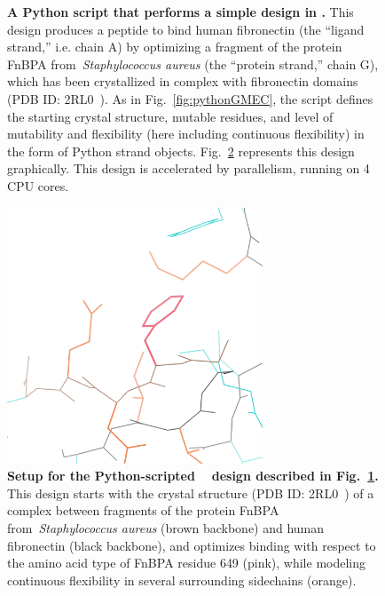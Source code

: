 \begin{figure}
\vspace{-0.7in}
\resizebox{\textwidth}{!}
{
	
}
\caption{\textbf{A Python script that performs a simple \bbks design in .}  This design produces a peptide to bind human fibronectin (the ``ligand strand,'' i.e. chain A) by optimizing a fragment of the protein FnBPA from~\textit{Staphylococcus aureus} (the ``protein strand,'' chain G), which has been crystallized in complex with fibronectin domains (PDB ID: 2RL0~\cite{2RL0}).  As in Fig.~\ref{fig:pythonGMEC}, the script defines the starting crystal structure, mutable residues, and level of mutability and flexibility (here including continuous flexibility) in the form of Python strand objects.   Fig.~\ref{fig:pythonBBKSpic} represents this design graphically.  This design is accelerated by parallelism, running on 4 CPU cores.    }
\label{fig:pythonBBKS}
\end{figure}

\begin{figure}
\includegraphics[width=3in]{figures/python_bbks_pic.png}
\caption{\textbf{Setup for the Python-scripted \bbks~\cite{BBK*} design described in Fig.~\ref{fig:pythonBBKS}.}  This design starts with the crystal structure (PDB ID: 2RL0~\cite{2RL0}) of a complex between fragments of the protein FnBPA from~\textit{Staphylococcus aureus} (brown backbone) and human fibronectin (black backbone), and optimizes binding with respect to the amino acid type of FnBPA residue 649 (pink), while modeling continuous flexibility in several surrounding sidechains (orange).  }
\label{fig:pythonBBKSpic}
\end{figure}